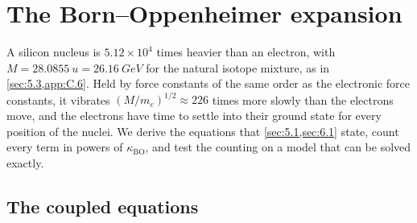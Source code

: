 \section{The Born--Oppenheimer expansion}\label{app:D.13}

A silicon nucleus is $5.12\times10^4$ times heavier than an electron, with $M = \SI{28.0855}{u} = \SI{26.16}{GeV}$ for the natural isotope mixture, as in \cref{sec:5.3,app:C.6}. Held by force constants of the same order as the electronic force constants, it vibrates $(M/m_e)^{1/2} \approx 226$ times more slowly than the electrons move, and the electrons have time to settle into their ground state for every position of the nuclei. We derive the equations that \cref{sec:5.1,sec:6.1} state, count every term in powers of $\kappa_{\mathrm{BO}}$, and test the counting on a model that can be solved exactly.

\subsection*{The coupled equations}

